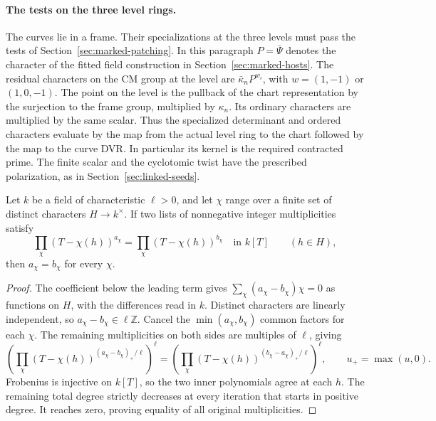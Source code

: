 \paragraph{The tests on the three level rings.}
\label{par:fitted-arc}
\hypertarget{source-ordinary-marked-points}{}
The curves lie in a frame. Their specializations at the three levels must pass the
tests of Section~\ref{sec:marked-patching}. In this
paragraph \(P=\bar\Psi\) denotes the character of the fitted field
construction in Section~\ref{sec:marked-hosts}. The residual characters
on the CM group at the level are
\(\bar\kappa_n P^{w_i}\), with \(w=(1,-1)\) or \((1,0,-1)\).
The point on the level is the pullback of the chart representation
by the surjection to the frame group, multiplied by \(\kappa_n\).
Its ordinary characters are multiplied by the same scalar. Thus the
specialized determinant and ordered characters evaluate by the map
from the actual level ring to the chart followed by the map to the
curve DVR. In particular its kernel is the required contracted prime.
The finite scalar and the cyclotomic twist have the prescribed
polarization, as in Section~\ref{sec:linked-seeds}.

\begin{auxlemma}\label{lem:residue-character-multiplicities}
Let \(k\) be a field of characteristic \(\ell>0\), and let \(\chi\) range over a finite set of distinct characters \(H\to k^\times\). If two lists of nonnegative integer multiplicities satisfy
\[
 \prod_\chi (T-\chi(h))^{a_\chi}
       =\prod_\chi (T-\chi(h))^{b_\chi}\quad\text{in }k[T]
       \qquad(h\in H),
\]
then \(a_\chi=b_\chi\) for every \(\chi\).
\end{auxlemma}
\begin{proof}
The coefficient below the leading term gives \(\sum_\chi (a_\chi-b_\chi)\chi=0\) as functions on \(H\), with the differences read in \(k\). Distinct characters are linearly independent, so \(a_\chi-b_\chi\in\ell\mathbb Z\). Cancel the \(\min(a_\chi,b_\chi)\) common factors for each \(\chi\). The remaining multiplicities on both sides are multiples of \(\ell\), giving
\[
 \left(\prod_\chi(T-\chi(h))^{(a_\chi-b_\chi)_+/\ell}\right)^\ell
 =
 \left(\prod_\chi(T-\chi(h))^{(b_\chi-a_\chi)_+/\ell}\right)^\ell ,
 \qquad u_+=\max(u,0).
\]
Frobenius is injective on \(k[T]\), so the two inner polynomials agree at each \(h\). The remaining total degree strictly decreases at every iteration that starts in positive degree. It reaches zero, proving equality of all original multiplicities.
\end{proof}

